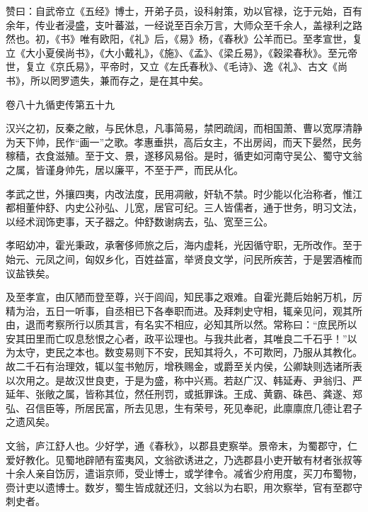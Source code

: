 \documentclass[12pt,UTF8]{ctexbook}
\begin{document}
赞曰：自武帝立《五经》博士，开弟子员，设科射策，劝以官禄，讫于元始，百有余年，传业者浸盛，支叶蕃滋，一经说至百余万言，大师众至千余人，盖禄利之路然也。初，《书》唯有欧阳，《礼》后，《易》杨，《春秋》公羊而已。至孝宣世，复立《大小夏侯尚书》，《大小戴礼》，《施》、《孟》、《梁丘易》，《穀梁春秋》。至元帝世，复立《京氏易》，平帝时，又立《左氏春秋》、《毛诗》、逸《礼》、古文《尚书》，所以罔罗遗失，兼而存之，是在其中矣。





卷八十九循吏传第五十九



汉兴之初，反秦之敝，与民休息，凡事简易，禁罔疏阔，而相国萧、曹以宽厚清静为天下帅，民作“画一”之歌。孝惠垂拱，高后女主，不出房闼，而天下晏然，民务稼穑，衣食滋殖。至于文、景，遂移风易俗。是时，循吏如河南守吴公、蜀守文翁之属，皆谨身帅先，居以廉平，不至于严，而民从化。



孝武之世，外攘四夷，内改法度，民用凋敝，奸轨不禁。时少能以化治称者，惟江都相董仲舒、内史公孙弘、儿宽，居官可纪。三人皆儒者，通于世务，明习文法，以经术润饰吏事，天子器之。仲舒数谢病去，弘、宽至三公。



孝昭幼冲，霍光秉政，承奢侈师旅之后，海内虚耗，光因循守职，无所改作。至于始元、元凤之间，匈奴乡化，百姓益富，举贤良文学，问民所疾苦，于是罢酒榷而议盐铁矣。



及至孝宣，由仄陋而登至尊，兴于闾阎，知民事之艰难。自霍光薨后始躬万机，厉精为治，五日一听事，自丞相已下各奉职而进。及拜刺史守相，辄亲见问，观其所由，退而考察所行以质其言，有名实不相应，必知其所以然。常称曰：“庶民所以安其田里而亡叹息愁恨之心者，政平讼理也。与我共此者，其唯良二千石乎！”以为太守，吏民之本也。数变易则下不安，民知其将久，不可欺罔，乃服从其教化。故二千石有治理效，辄以玺书勉厉，增秩赐金，或爵至关内侯，公卿缺则选诸所表以次用之。是故汉世良吏，于是为盛，称中兴焉。若赵广汉、韩延寿、尹翁归、严延年、张敞之属，皆称其位，然任刑罚，或抵罪诛。王成、黄霸、硃邑、龚遂、郑弘、召信臣等，所居民富，所去见思，生有荣号，死见奉祀，此廪廪庶几德让君子之遗风矣。



文翁，庐江舒人也。少好学，通《春秋》，以郡县吏察举。景帝末，为蜀郡守，仁爱好教化。见蜀地辟陋有蛮夷风，文翁欲诱进之，乃选郡县小吏开敏有材者张叔等十余人亲自饬厉，遣诣京师，受业博士，或学律令。减省少府用度，买刀布蜀物，赍计吏以遗博士。数岁，蜀生皆成就还归，文翁以为右职，用次察举，官有至郡守刺史者。
\end{document}
